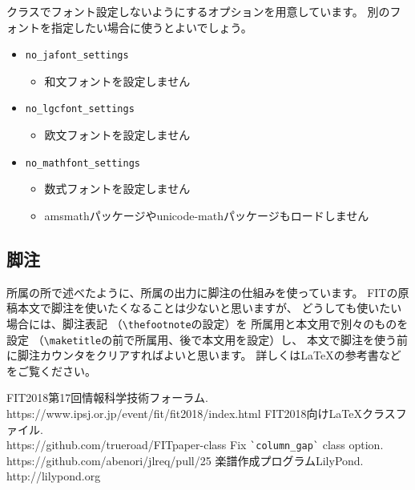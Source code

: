 \documentclass{FITpaper}
\begin{document}
クラスでフォント設定しないようにするオプションを用意しています。
別のフォントを指定したい場合に使うとよいでしょう。

\begin{itemize}
\item \texttt{no\_jafont\_settings}
  \begin{itemize}
  \item 和文フォントを設定しません
  \end{itemize}
\item \texttt{no\_lgcfont\_settings}
  \begin{itemize}
  \item 欧文フォントを設定しません
  \end{itemize}
\item \texttt{no\_mathfont\_settings}
  \begin{itemize}
  \item 数式フォントを設定しません
  \item amsmathパッケージやunicode-mathパッケージもロードしません
  \end{itemize}
\end{itemize}

\subsection{脚注}

所属の所で述べたように、所属の出力に脚注の仕組みを使っています。
FITの原稿本文で脚注を使いたくなることは少ないと思いますが、
どうしても使いたい場合には、脚注表記
（\texttt{\textbackslash thefootnote}の設定）を
所属用と本文用で別々のものを設定
（\texttt{\textbackslash maketitle}の前で所属用、後で本文用を設定）し、
本文で脚注を使う前に脚注カウンタをクリアすればよいと思います。
詳しくは\LaTeX の参考書などをご覧ください。


\begin{thebibliography}{9}

  FIT2018第17回情報科学技術フォーラム. \\
  https://www.ipsj.or.jp/event/fit/fit2018/index.html
  FIT2018向け\LaTeX クラスファイル. \\
  https://github.com/trueroad/FITpaper-class
  Fix \verb|`column_gap`| class option. \\
  https://github.com/abenori/jlreq/pull/25
  楽譜作成プログラムLilyPond. \\
  http://lilypond.org

\end{thebibliography}
\end{document}
